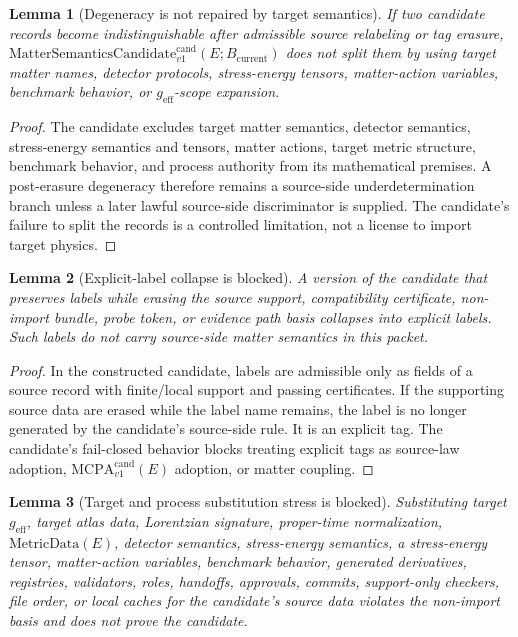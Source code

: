 \documentclass[11pt]{article}
\newcommand{\MetricData}{\mathrm{MetricData}}
\newcommand{\geff}{g_{\mathrm{eff}}}
\newcommand{\MCPA}{\mathrm{MCPA}^{\mathrm{cand}}_{v1}}
\newcommand{\Bcur}{B_{\mathrm{current}}}
\newcommand{\MSCand}{\mathrm{MatterSemanticsCandidate}^{\mathrm{cand}}_{v1}}
\newtheorem{lemma}{Lemma}
\begin{document}
\begin{lemma}[Degeneracy is not repaired by target semantics]
If two candidate records become indistinguishable after admissible source
relabeling or tag erasure, \(\MSCand(E;\Bcur)\) does not split them by using
target matter names, detector protocols, stress-energy tensors, matter-action
variables, benchmark behavior, or \(\geff\)-scope expansion.
\end{lemma}

\begin{proof}
The candidate excludes target matter semantics, detector semantics,
stress-energy semantics and tensors, matter actions, target metric structure,
benchmark behavior, and process authority from its mathematical premises. A
post-erasure degeneracy therefore remains a source-side underdetermination
branch unless a later lawful source-side discriminator is supplied. The
candidate's failure to split the records is a controlled limitation, not a
license to import target physics.
\end{proof}

\begin{lemma}[Explicit-label collapse is blocked]
A version of the candidate that preserves labels while erasing the source
support, compatibility certificate, non-import bundle, probe token, or evidence
path basis collapses into explicit labels. Such labels do not carry
source-side matter semantics in this packet.
\end{lemma}

\begin{proof}
In the constructed candidate, labels are admissible only as fields of a source
record with finite/local support and passing certificates. If the supporting
source data are erased while the label name remains, the label is no longer
generated by the candidate's source-side rule. It is an explicit tag. The
candidate's fail-closed behavior blocks treating explicit tags as source-law
adoption, \(\MCPA(E)\) adoption, or matter coupling.
\end{proof}

\begin{lemma}[Target and process substitution stress is blocked]
Substituting target \(\geff\), target atlas data, Lorentzian signature,
proper-time normalization, \(\MetricData(E)\), detector semantics,
stress-energy semantics, a stress-energy tensor, matter-action variables,
benchmark behavior, generated derivatives, registries, validators, roles,
handoffs, approvals, commits, support-only checkers, file order, or local
caches for the candidate's source data violates the non-import basis and does
not prove the candidate.
\end{lemma}
\end{document}
